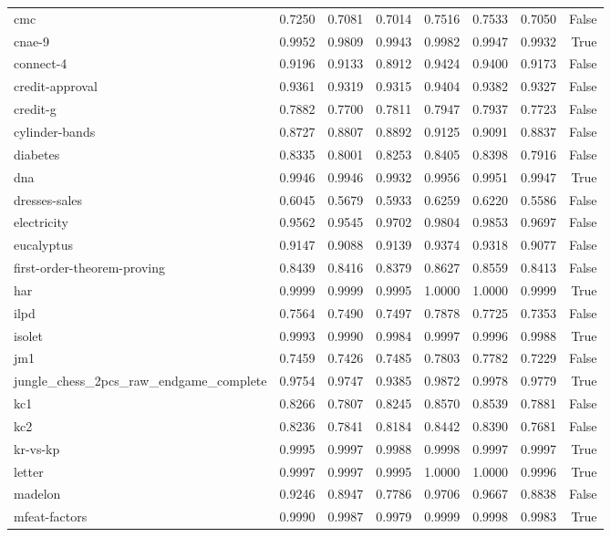 \begin{table}[htbp]
\begin{tabular}{lrrrrrrr}
cmc & 0.7250 & 0.7081 & 0.7014 & 0.7516 & 0.7533 & 0.7050 & False \\
cnae-9 & 0.9952 & 0.9809 & 0.9943 & 0.9982 & 0.9947 & 0.9932 & True \\
connect-4 & 0.9196 & 0.9133 & 0.8912 & 0.9424 & 0.9400 & 0.9173 & False \\
credit-approval & 0.9361 & 0.9319 & 0.9315 & 0.9404 & 0.9382 & 0.9327 & False \\
credit-g & 0.7882 & 0.7700 & 0.7811 & 0.7947 & 0.7937 & 0.7723 & False \\
cylinder-bands & 0.8727 & 0.8807 & 0.8892 & 0.9125 & 0.9091 & 0.8837 & False \\
diabetes & 0.8335 & 0.8001 & 0.8253 & 0.8405 & 0.8398 & 0.7916 & False \\
dna & 0.9946 & 0.9946 & 0.9932 & 0.9956 & 0.9951 & 0.9947 & True \\
dresses-sales & 0.6045 & 0.5679 & 0.5933 & 0.6259 & 0.6220 & 0.5586 & False \\
electricity & 0.9562 & 0.9545 & 0.9702 & 0.9804 & 0.9853 & 0.9697 & False \\
eucalyptus & 0.9147 & 0.9088 & 0.9139 & 0.9374 & 0.9318 & 0.9077 & False \\
first-order-theorem-proving & 0.8439 & 0.8416 & 0.8379 & 0.8627 & 0.8559 & 0.8413 & False \\
har & 0.9999 & 0.9999 & 0.9995 & 1.0000 & 1.0000 & 0.9999 & True \\
ilpd & 0.7564 & 0.7490 & 0.7497 & 0.7878 & 0.7725 & 0.7353 & False \\
isolet & 0.9993 & 0.9990 & 0.9984 & 0.9997 & 0.9996 & 0.9988 & True \\
jm1 & 0.7459 & 0.7426 & 0.7485 & 0.7803 & 0.7782 & 0.7229 & False \\
jungle\_chess\_2pcs\_raw\_endgame\_complete & 0.9754 & 0.9747 & 0.9385 & 0.9872 & 0.9978 & 0.9779 & True \\
kc1 & 0.8266 & 0.7807 & 0.8245 & 0.8570 & 0.8539 & 0.7881 & False \\
kc2 & 0.8236 & 0.7841 & 0.8184 & 0.8442 & 0.8390 & 0.7681 & False \\
kr-vs-kp & 0.9995 & 0.9997 & 0.9988 & 0.9998 & 0.9997 & 0.9997 & True \\
letter & 0.9997 & 0.9997 & 0.9995 & 1.0000 & 1.0000 & 0.9996 & True \\
madelon & 0.9246 & 0.8947 & 0.7786 & 0.9706 & 0.9667 & 0.8838 & False \\
mfeat-factors & 0.9990 & 0.9987 & 0.9979 & 0.9999 & 0.9998 & 0.9983 & True \\

\end{tabular}
\end{table}
